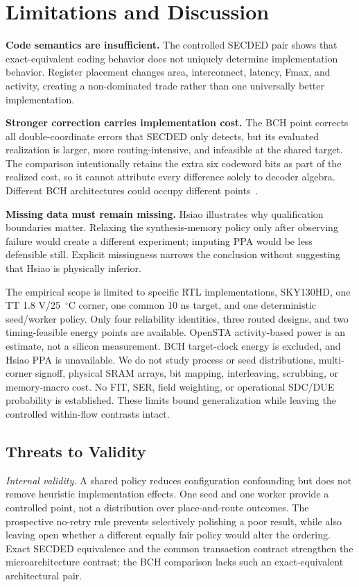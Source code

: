\section{Limitations and Discussion}

\textbf{Code semantics are insufficient.} The controlled SECDED pair shows that exact-equivalent coding behavior does not uniquely determine implementation behavior. Register placement changes area, interconnect, latency, Fmax, and activity, creating a non-dominated trade rather than one universally better implementation.

\textbf{Stronger correction carries implementation cost.} The BCH point corrects all double-coordinate errors that SECDED only detects, but its evaluated realization is larger, more routing-intensive, and infeasible at the shared target. The comparison intentionally retains the extra six codeword bits as part of the realized cost, so it cannot attribute every difference solely to decoder algebra. Different BCH architectures could occupy different points~\cite{wong2011,lagendijk2026}.

\textbf{Missing data must remain missing.} Hsiao illustrates why qualification boundaries matter. Relaxing the synthesis-memory policy only after observing failure would create a different experiment; imputing PPA would be less defensible still. Explicit missingness narrows the conclusion without suggesting that Hsiao is physically inferior.

The empirical scope is limited to specific RTL implementations, SKY130HD, one TT 1.8 V/25~$^{\circ}$C corner, one common 10 ns target, and one deterministic seed/worker policy. Only four reliability identities, three routed designs, and two timing-feasible energy points are available. OpenSTA activity-based power is an estimate, not a silicon measurement. BCH target-clock energy is excluded, and Hsiao PPA is unavailable. We do not study process or seed distributions, multi-corner signoff, physical SRAM arrays, bit mapping, interleaving, scrubbing, or memory-macro cost. No FIT, SER, field weighting, or operational SDC/DUE probability is established. These limits bound generalization while leaving the controlled within-flow contrasts intact.

\subsection{Threats to Validity}

\textit{Internal validity.} A shared policy reduces configuration confounding but does not remove heuristic implementation effects. One seed and one worker provide a controlled point, not a distribution over place-and-route outcomes. The prospective no-retry rule prevents selectively polishing a poor result, while also leaving open whether a different equally fair policy would alter the ordering. Exact SECDED equivalence and the common transaction contract strengthen the microarchitecture contrast; the BCH comparison lacks such an exact-equivalent architectural pair.


